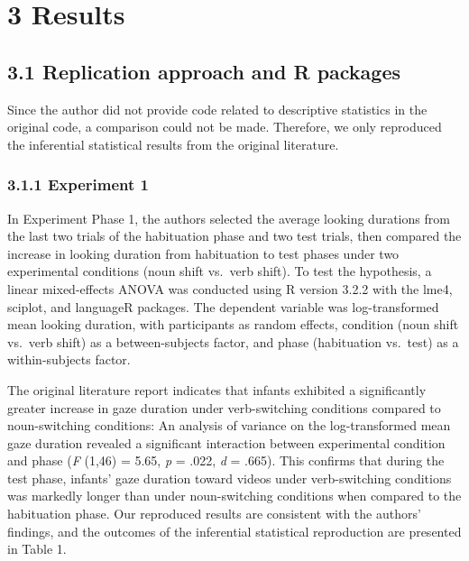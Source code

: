 \documentclass[
  man]{apa6}
\begin{document}
\section{3 Results}\label{results}

\subsection{3.1 Replication approach and R packages}\label{replication-approach-and-r-packages-1}

Since the author did not provide code related to descriptive statistics in the original code, a comparison could not be made. Therefore, we only reproduced the inferential statistical results from the original literature.

\subsubsection{3.1.1 Experiment 1}\label{experiment-1}

In Experiment Phase 1, the authors selected the average looking durations from the last two trials of the habituation phase and two test trials, then compared the increase in looking duration from habituation to test phases under two experimental conditions (noun shift vs.~verb shift). To test the hypothesis, a linear mixed-effects ANOVA was conducted using R version 3.2.2 with the lme4, sciplot, and languageR packages. The dependent variable was log-transformed mean looking duration, with participants as random effects, condition (noun shift vs.~verb shift) as a between-subjects factor, and phase (habituation vs.~test) as a within-subjects factor.

The original literature report indicates that infants exhibited a significantly greater increase in gaze duration under verb-switching conditions compared to noun-switching conditions: An analysis of variance on the log-transformed mean gaze duration revealed a significant interaction between experimental condition and phase (\emph{F} (1,46) = 5.65, \emph{p} = .022, \emph{d} = .665). This confirms that during the test phase, infants' gaze duration toward videos under verb-switching conditions was markedly longer than under noun-switching conditions when compared to the habituation phase. Our reproduced results are consistent with the authors' findings, and the outcomes of the inferential statistical reproduction are presented in Table 1.
\end{document}

